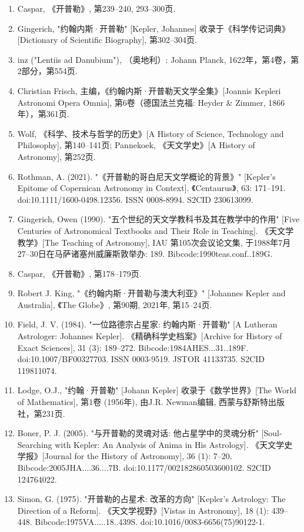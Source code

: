 \begin{enumerate}
\item Caspar, 《开普勒》, 第239–240, 293–300页.
\item Gingerich, "约翰内斯·开普勒" [Kepler, Johannes] 收录于《科学传记词典》[Dictionary of Scientific Biography], 第302–304页.
\item inz ("Lentiis ad Danubium"), （奥地利）: Johann Planck, 1622年，第4卷，第2部分，第554页.
\item Christian Frisch, 主编，《约翰内斯·开普勒天文学全集》[Joannis Kepleri Astronomi Opera Omnia], 第6卷（德国法兰克福: Heyder & Zimmer, 1866年），第361页.
\item Wolf, 《科学、技术与哲学的历史》[A History of Science, Technology and Philosophy], 第140–141页; Pannekoek, 《天文学史》[A History of Astronomy], 第252页.
\item Rothman, A. (2021). "《开普勒的哥白尼天文学概论的背景》" [Kepler's Epitome of Copernican Astronomy in Context]. 《Centaurus》, 63: 171–191. doi:10.1111/1600-0498.12356. ISSN 0008-8994. S2CID 230613099.
\item Gingerich, Owen (1990). "五个世纪的天文学教科书及其在教学中的作用" [Five Centuries of Astronomical Textbooks and Their Role in Teaching]. 《天文学教学》[The Teaching of Astronomy], IAU 第105次会议论文集, 于1988年7月27–30日在马萨诸塞州威廉斯敦举办: 189. Bibcode:1990teas.conf..189G.
\item Caspar, 《开普勒》, 第178–179页.
\item Robert J. King, "《约翰内斯·开普勒与澳大利亚》" [Johannes Kepler and Australia], 《The Globe》, 第90期, 2021年, 第15–24页.
\item Field, J. V. (1984). "一位路德宗占星家: 约翰内斯·开普勒" [A Lutheran Astrologer: Johannes Kepler]. 《精确科学史档案》[Archive for History of Exact Sciences], 31 (3): 189–272. Bibcode:1984AHES...31..189F. doi:10.1007/BF00327703. ISSN 0003-9519. JSTOR 41133735. S2CID 119811074.
\item Lodge, O.J., "约翰·开普勒" [Johann Kepler] 收录于《数学世界》[The World of Mathematics], 第1卷 (1956年), 由J.R. Newman编辑, 西蒙与舒斯特出版社，第231页.
\item Boner, P. J. (2005). "与开普勒的灵魂对话: 他占星学中的灵魂分析" [Soul-Searching with Kepler: An Analysis of Anima in His Astrology]. 《天文学史学报》[Journal for the History of Astronomy], 36 (1): 7–20. Bibcode:2005JHA....36....7B. doi:10.1177/002182860503600102. S2CID 124764022.
\item Simon, G. (1975). "开普勒的占星术: 改革的方向" [Kepler's Astrology: The Direction of a Reform]. 《天文学视野》[Vistas in Astronomy], 18 (1): 439–448. Bibcode:1975VA.....18..439S. doi:10.1016/0083-6656(75)90122-1.

\end{enumerate}
